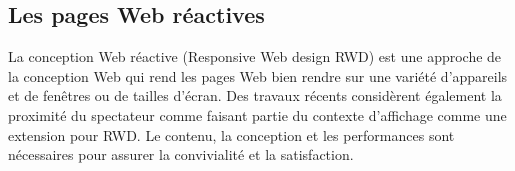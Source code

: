 \documentclass[12pt]{report}
\begin{document}
\newpage

\subsection{Les pages Web réactives}

La conception Web réactive (Responsive Web design RWD) est une approche de la conception Web qui rend les pages Web bien rendre sur une variété d’appareils et de fenêtres ou de tailles d’écran. Des travaux récents considèrent également la proximité du spectateur comme faisant partie du contexte d’affichage comme une extension pour RWD. Le contenu, la conception et les performances sont nécessaires pour assurer la convivialité et la satisfaction.

\vspace{0.2in}
\end{document}
